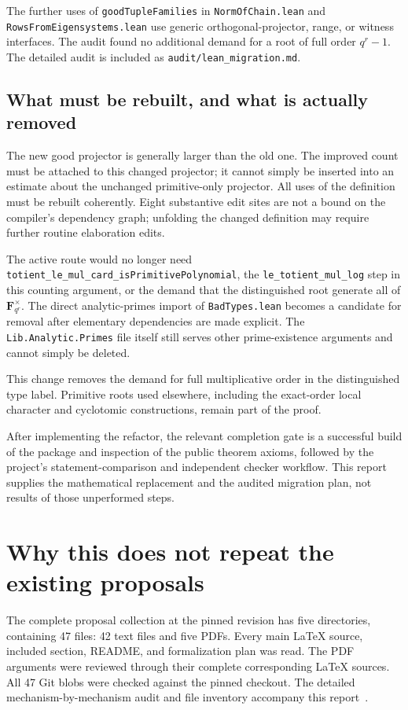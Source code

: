 \documentclass[11pt,a4paper]{article}
\newcommand{\F}{\mathbf F}
\newcommand{\src}[1]{\nolinkurl{#1}}
\theoremstyle{definition}
\theoremstyle{remark}
\begin{document}
The further uses of \src{goodTupleFamilies} in
\src{NormOfChain.lean} and \src{RowsFromEigensystems.lean} use generic
orthogonal-projector, range, or witness interfaces. The audit found no
additional demand for a root of full order $q^r-1$. The detailed audit is
included as \src{audit/lean_migration.md}.

\subsection{What must be rebuilt, and what is actually removed}

The new good projector is generally larger than the old one. The improved
count must be attached to this changed projector; it cannot simply be
inserted into an estimate about the unchanged primitive-only projector.
All uses of the definition must be rebuilt coherently. Eight substantive
edit sites are not a bound on the compiler's dependency graph; unfolding
the changed definition may require further routine elaboration edits.

The active route would no longer need
\src{totient_le_mul_card_isPrimitivePolynomial}, the
\src{le_totient_mul_log} step in this counting argument, or the demand
that the distinguished root generate all of $\F_{q^r}^{\times}$. The
direct analytic-primes import of \src{BadTypes.lean} becomes a candidate
for removal after elementary dependencies are made explicit. The
\src{Lib.Analytic.Primes} file itself still serves other prime-existence
arguments and cannot simply be deleted.

This change removes the demand for full multiplicative order in the
distinguished type label. Primitive roots used elsewhere, including the
exact-order local character and cyclotomic constructions, remain part
of the proof.

After implementing the refactor, the relevant completion gate is a
successful build of the package and inspection of the public theorem
axioms, followed by the project's statement-comparison and independent
checker workflow. This report supplies the mathematical replacement and
the audited migration plan, not results of those unperformed steps.

\section{Why this does not repeat the existing proposals}
\label{sec:novelty}

The complete proposal collection at the pinned revision has five
directories, containing 47 files: 42 text files and five PDFs. Every main
LaTeX source, included section, README, and formalization plan was read.
The PDF arguments were reviewed through their complete corresponding
LaTeX sources. All 47 Git blobs were checked against the pinned checkout.
The detailed mechanism-by-mechanism audit and file inventory accompany
this report~\cite{proposals}.
\end{document}
